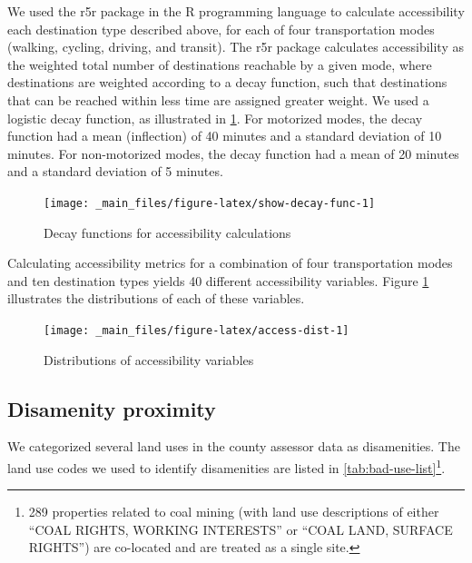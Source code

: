 \documentclass[
]{book}
\begin{document}
We used the r5r package in the R programming language \citep{pereira_r5r_2021} to
calculate accessibility each destination type described above,
for each of four transportation modes (walking, cycling, driving, and transit).
The r5r package calculates accessibility as the weighted total number of
destinations reachable by a given mode, where destinations are weighted
according to a decay function, such that destinations that can be reached within
less time are assigned greater weight. We used a logistic decay function, as
illustrated in \ref{fig:show-decay-func}. For motorized modes, the decay
function had a mean (inflection) of 40 minutes and a standard deviation of 10
minutes. For non-motorized modes, the decay function had a mean of 20 minutes
and a standard deviation of 5 minutes.

\begin{figure}

{\centering \texttt{[image: \_main\_files/figure-latex/show-decay-func-1]} 

}

\caption{Decay functions for accessibility calculations}\label{fig:show-decay-func}
\end{figure}

Calculating accessibility metrics for a combination of four transportation
modes and ten destination types yields 40 different accessibility variables. Figure \ref{fig:show-decay-func}
illustrates the distributions of each of these variables.

\begin{figure}

{\centering \texttt{[image: \_main\_files/figure-latex/access-dist-1]} 

}

\caption{Distributions of accessibility variables}\label{fig:access-dist}
\end{figure}

\hypertarget{disamenity-proximity}{%
\subsection{Disamenity proximity}\label{disamenity-proximity}}

We categorized several land uses in the county assessor data as
disamenities. The land use codes we used to identify disamenities are
listed in \ref{tab:bad-use-list}\footnote{289 properties related to coal mining
  (with land use descriptions of either ``COAL RIGHTS, WORKING INTERESTS'' or
  ``COAL LAND, SURFACE RIGHTS'') are co-located and are treated as a single
  site.}.
\end{document}
